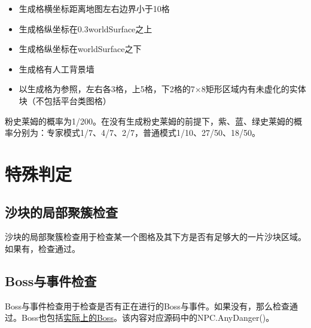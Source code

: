 \begin{itemize}
    \item 生成格横坐标距离地图左右边界小于10格
    \item 生成格纵坐标在0.3worldSurface之上
    \item 生成格纵坐标在worldSurface之下
    \item 生成格有人工背景墙
    \item 以生成格为参照，左右各3格，上5格，下2格的7$\times$8矩形区域内有未虚化的实体块（不包括平台类图格）
\end{itemize}

粉史莱姆的概率为1/200。在没有生成粉史莱姆的前提下，紫、蓝、绿史莱姆的概率分别为：专家模式1/7、4/7、2/7，普通模式1/10、27/50、18/50。

\section{特殊判定}
\subsection{沙块的局部聚簇检查}
沙块的局部聚簇检查用于检查某一个图格及其下方是否有足够大的一片沙块区域。如果有，检查通过。

\subsection{Boss与事件检查}\label{app41}
Boss与事件检查用于检查是否有正在进行的Boss与事件。如果没有，那么检查通过。Boss也包括\hyperref[app10]{实际上的Boss}。该内容对应源码中的NPC.AnyDanger()。
